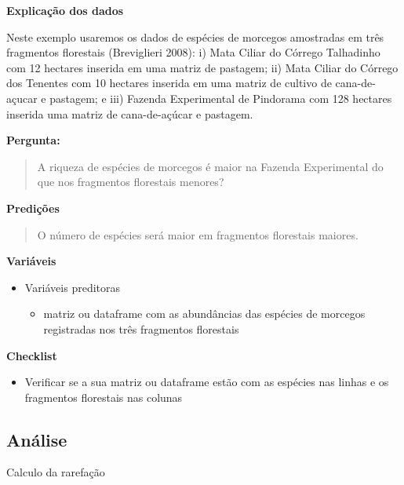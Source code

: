 \documentclass[
]{book}
\providecommand{\tightlist}{%
  \setlength{\itemsep}{0pt}\setlength{\parskip}{0pt}}
\begin{document}
\textbf{Explicação dos dados}

Neste exemplo usaremos os dados de espécies de morcegos amostradas em três fragmentos florestais (Breviglieri 2008): i) Mata Ciliar do Córrego Talhadinho com 12 hectares inserida em uma matriz de pastagem; ii) Mata Ciliar do Córrego dos Tenentes com 10 hectares inserida em uma matriz de cultivo de cana-de-açucar e pastagem; e iii) Fazenda Experimental de Pindorama com 128 hectares inserida uma matriz de cana-de-açúcar e pastagem.

\textbf{Pergunta:}

\begin{quote}
A riqueza de espécies de morcegos é maior na Fazenda Experimental do que nos fragmentos florestais menores?
\end{quote}

\textbf{Predições}

\begin{quote}
O número de espécies será maior em fragmentos florestais maiores.
\end{quote}

\textbf{Variáveis}

\begin{itemize}
\tightlist
\item
  Variáveis preditoras

  \begin{itemize}
  \tightlist
  \item
    matriz ou dataframe com as abundâncias das espécies de morcegos registradas nos três fragmentos florestais
  \end{itemize}
\end{itemize}

\textbf{Checklist}

\begin{itemize}
\tightlist
\item
  Verificar se a sua matriz ou dataframe estão com as espécies nas linhas e os fragmentos florestais nas colunas
\end{itemize}

\hypertarget{anuxe1lise}{%
\subsection{Análise}\label{anuxe1lise}}

Calculo da rarefação
\end{document}
